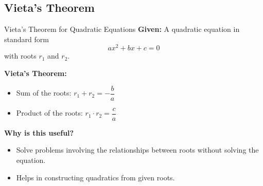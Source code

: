 \documentclass{beamer}
\begin{document}
\begin{frame}
\section{Vieta’s Theorem}
\end{frame}

\begin{frame}{Vieta's Theorem for Quadratic Equations}
\textbf{Given:} A quadratic equation in standard form
\[
ax^2 + bx + c = 0
\]
with roots $r_1$ and $r_2$.

\vspace{0.3cm}
\textbf{Vieta's Theorem:}
\begin{itemize}
    \item Sum of the roots: $r_1 + r_2 = -\dfrac{b}{a}$
    \item Product of the roots: $r_1 \cdot r_2 = \dfrac{c}{a}$
\end{itemize}

\vspace{0.3cm}
\textbf{Why is this useful?}
\begin{itemize}
    \item Solve problems involving the relationships between roots without solving the equation.
    \item Helps in constructing quadratics from given roots.
\end{itemize}
\end{frame}
\end{document}
